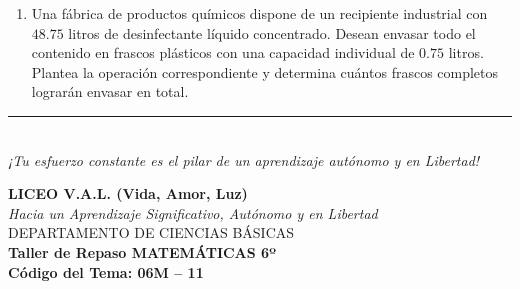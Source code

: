 \documentclass[12pt, letterpaper]{article}
\begin{document}
\begin{enumerate}[itemsep=0.8cm]
		A partir de la información de la tabla, responde:
		\begin{enumerate}[label=\alph*., itemsep=0.2cm, topsep=0.2cm]
			\item ¿Cuál es el peso exacto de un solo bulto de café orgánico?
			\item ¿Cuál es el peso exacto de un solo bulto de azúcar refinada?
			\item ¿Cuál de los tres productos tiene el bulto individual de mayor peso?
		\end{enumerate}
		
		\item Una fábrica de productos químicos dispone de un recipiente industrial con $48.75$ litros de desinfectante líquido concentrado. Desean envasar todo el contenido en frascos plásticos con una capacidad individual de $0.75$ litros. Plantea la operación correspondiente y determina cuántos frascos completos lograrán envasar en total.
		
	\end{enumerate}
	
	\vfill
	\begin{center}
		\rule{0.5\textwidth}{0.4pt} \\
		\vspace{0.2cm}
		\textit{¡Tu esfuerzo constante es el pilar de un aprendizaje autónomo y en Libertad!}
	\end{center}
	
	\newpage
	\begin{center}
		{\Large \textbf{LICEO V.A.L. (Vida, Amor, Luz)}}\\[0.1cm]
		{\normalsize \textit{Hacia un Aprendizaje Significativo, Autónomo y en Libertad}}\\[0.2cm]
		{\large DEPARTAMENTO DE CIENCIAS BÁSICAS}\\[0.1cm]
		\textbf{Taller de Repaso MATEMÁTICAS 6º}\\[0.1cm]
		\textbf{Código del Tema: 06M – 11}\\[0.1cm]
	\end{center}
	
\end{document}
